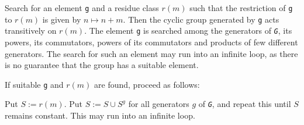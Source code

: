 \documentclass[a4paper,11pt]{report}
\begin{document}
{\begin{description}
 Search for an element \texttt{g} and a residue class $r(m)$ such that the restriction of \texttt{g} to $r(m)$ is given by $n \mapsto n + m$. Then the cyclic group generated by \texttt{g} acts transitively on $r(m)$. The element \texttt{g} is searched among the generators of \mbox{\texttt{\mdseries\slshape G}}, its powers, its commutators, powers of its commutators and products of few
different generators. The search for such an element may run into an infinite
loop, as there is no guarantee that the group has a suitable element. 

 If suitable \texttt{g} and $r(m)$ are found, proceed as follows: 

 Put $S := r(m)$. Put $S := S \cup S^g$ for all generators $g$ of \mbox{\texttt{\mdseries\slshape G}}, and repeat this until $S$ remains constant. This may run into an infinite loop. 


\end{description}}
\end{document}
